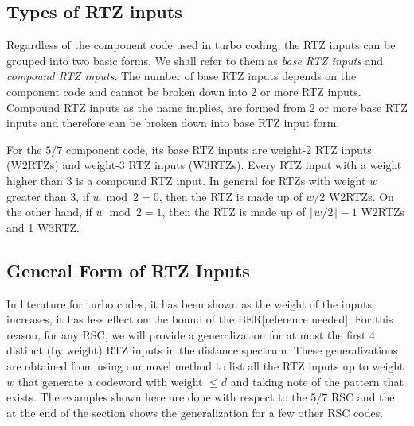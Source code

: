\subsection{Types of RTZ inputs}
Regardless of the component code used in turbo coding, the RTZ inputs can be grouped into two basic forms. We shall refer to them as \textit{base RTZ inputs} and \textit{compound RTZ inputs}. The number of base RTZ inputs depends on the component code and cannot be broken down into 2 or more RTZ inputs. Compound RTZ inputs as the name implies, are formed from 2 or more base RTZ inputs and therefore can be broken down into base RTZ input form.

For the $5/7$ component code, its base RTZ inputs are weight-$2$ RTZ inputs  (W2RTZs) and weight-$3$ RTZ inputs (W3RTZs). Every RTZ input with a weight higher than 3 is a compound RTZ input. In general for RTZs with weight $w$ greater than 3, if $w \bmod 2=0$, then the RTZ is made up of $w/2$ W2RTZs. On the other hand, if $w \bmod 2=1$, then the RTZ is made up of $\lfloor w/2 \rfloor -1$ W2RTZs and 1 W3RTZ.


\subsection{General Form of RTZ Inputs}
In literature for turbo codes, it has been shown as the weight of the inputs increases, it has less effect on the bound of the BER[reference needed]. For this reason, for any RSC, we will provide a generalization for at most the first 4 distinct (by weight) RTZ inputs in the distance spectrum. These generalizations are obtained from using our novel method to list all the RTZ inputs up to weight $w$ that generate a codeword with weight $\leq d$ and taking note of the pattern that exists. The examples shown here are done with respect to the $5/7$ RSC and the at the end of the section shows the generalization for a few other RSC codes.

